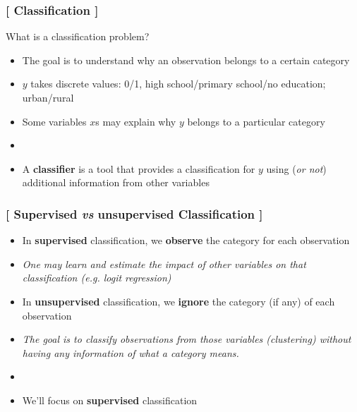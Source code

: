 \documentclass[xcolor=x11names,compress, aspectratio=169]{beamer}
\renewcommand{\(}{\begin{columns}}
\renewcommand{\)}{\end{columns}}
\newcommand{\<}[1]{\begin{column}{#1}}
\renewcommand{\>}{\end{column}}
\begin{document}
\begin{frame} %

\frametitle{\textcolor{brique}{[ Classification ]}}
What is a classification problem?
\pause
\begin{itemize}[<+->]
  \item The goal  is to understand why an observation belongs to a certain category
  \item  $y$  takes discrete values:  0/1, high school/primary school/no education; urban/rural
  \item Some variables $x$s may explain why $y$ belongs to a particular category
  \item[]
  \item[] \begin{center}A \textbf{classifier} is a tool that provides a classification for $y$ using (\textit{or not}) additional information from other variables \end{center}
\end{itemize}
\end{frame}

\begin{frame} %
\frametitle{\textcolor{brique}{[ Supervised \textit{vs} unsupervised Classification ]}}
\pause
\begin{itemize}[<+->]
  \item In \textbf{supervised }classification, we \textbf{observe} the category for each observation
  \item[] \textit{One may learn  and estimate the impact of other variables on that classification (\textit{e.g}. logit regression)}
   \item In \textbf{unsupervised }classification, we \textbf{ignore} the category (if any) of each observation
  \item[]  \textit{The goal is to classify observations from those variables (clustering) without having any information of what a category means.}
  \item[]
  \item We'll focus on \textbf{supervised }classification
\end{itemize}
\end{frame}
\end{document}
